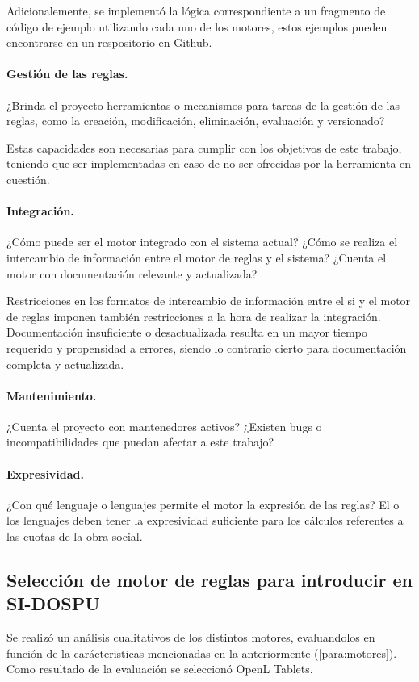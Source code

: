 Adicionalemente, se implementó la lógica correspondiente a un fragmento de código de ejemplo utilizando cada uno de los motores, estos ejemplos pueden encontrarse en \href{https://github.com/IvanB101/ejemplos-motores-reglas}{un respositorio en Github}.

\paragraph{Gestión de las reglas.}
¿Brinda el proyecto herramientas o mecanismos para tareas de la gestión de las reglas, como la creación, modificación, eliminación, evaluación y versionado?

Estas capacidades son necesarias para cumplir con los objetivos de este trabajo, teniendo que ser implementadas en caso de no ser ofrecidas por la herramienta en cuestión.

\paragraph{Integración.}
¿Cómo puede ser el motor integrado con el sistema actual? ¿Cómo se realiza el intercambio de información entre el motor de reglas y el sistema? ¿Cuenta el motor con documentación relevante y actualizada?

Restricciones en los formatos de intercambio de información entre el \acrshort{si} y el motor de reglas imponen también restricciones a la hora de realizar la integración.
Documentación insuficiente o desactualizada resulta en un mayor tiempo requerido y propensidad a errores, siendo lo contrario cierto para documentación completa y actualizada.

\paragraph{Mantenimiento.}
¿Cuenta el proyecto con mantenedores activos? ¿Existen bugs o incompatibilidades que puedan afectar a este trabajo?

\paragraph{Expresividad.}
¿Con qué lenguaje o lenguajes permite el motor la expresión de las reglas? El o los lenguajes deben tener la expresividad suficiente para los cálculos referentes a las cuotas de la obra social.

\subsection{Selección de motor de reglas para introducir en SI-DOSPU}
Se realizó un análisis cualitativos de los distintos motores, evaluandolos en función de la carácteristicas mencionadas en la anteriormente (\cref{para:motores}). Como resultado de la evaluación se seleccionó OpenL Tablets.

